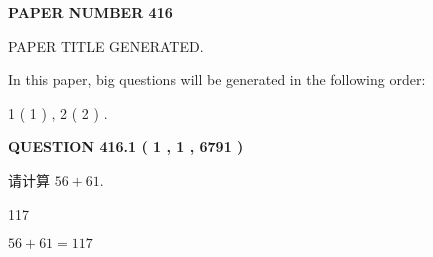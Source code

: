 \documentclass{ctexart}
\begin{document}
 
 
   
   
\newpage 
\setcounter{page}{ 
   416001 } 
   
   
   
   
 {\textbf{ \Large{ PAPER NUMBER  416  }}}
   
   
\vspace{0.2in}
   
   
   
   
   
   
   
   
 \vspace{0.2in}
 
 
 
 
   
   
 PAPER TITLE GENERATED.
   
   
   
\vspace{0.2in}
   
In this paper, big questions will be generated in the following order: 
   
   
   1 ( 1 )
 ,
   2 ( 2 )
 .
  
\vspace{0.2in}
  
{\textbf{\Large{QUESTION
416.1 
 ( 1 , 1 , 6791 )
}}}
  
  
 
请计算 $ %
56 +  %
61 $.
 
 
 
\noindent{}
 
 

117
 
 
\noindent{}
 
 

 
 
 
\noindent{}
 
 

$ %
56 +  %
61=   %
117$
 
 
\noindent{}
 
 

 
   
   
   
\end{document}
